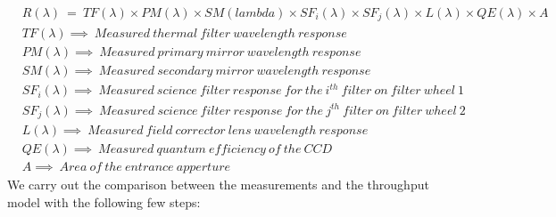 \documentclass[12pt]{spieman}  %
\begin{document}
 \begin{align*}
     & R(\lambda)~=~TF(\lambda)\times PM(\lambda)\times SM(lambda)\times SF_{i}(\lambda)\times SF_{j}(\lambda)\times L(\lambda)\times QE(\lambda)\times A\\
     & TF(\lambda)\implies~Measured~thermal~filter~wavelength~response \\
     & PM(\lambda)\implies~Measured~primary~mirror~wavelength~response \\
     & SM(\lambda)\implies~Measured~secondary~mirror~wavelength~response \\
     & SF_{i}(\lambda)\implies~Measured~science~filter~response~for~the~i^{th}~filter~on~filter~wheel~1 \\
     & SF_{j}(\lambda)\implies~Measured~science~filter~response~for~the~j^{th}~filter~on~filter~wheel~2  \\
     & L(\lambda)\implies~Measured~field~corrector~lens~wavelength~response \\
     & QE(\lambda)\implies~Measured~quantum~efficiency~of~the~CCD \\
     & A\implies~Area~of~the~entrance~apperture
 \end{align*}
 We carry out the comparison between the measurements and the throughput model with the following few steps:
\end{document}
